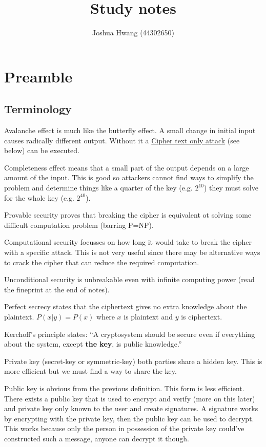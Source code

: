 \documentclass{report}
\title{Study notes}
\author{Joshua Hwang (44302650)}
\begin{document}
\maketitle

\chapter{Preamble}
\section{Terminology}
Avalanche effect is much like the butterfly effect. A small change in initial
input causes radically different output. Without it a
\underline{Cipher text only attack} (see below) can be executed.

Completeness effect means that a small part of the output depends on a large
amount of the input. This is good so attackers cannot find ways to simplify
the problem and determine things like a quarter of the key (e.g. $2^{10}$)
they must solve for the whole key (e.g. $2^{40}$).

Provable security proves that breaking the cipher is
equivalent ot solving some difficult computation problem (barring P=NP).

Computational security focusses on how long it would take to break the cipher
with a specific attack. This is not very useful since there may be alternative
ways to crack the cipher that can reduce the required computation.

Unconditional security is unbreakable even with infinite computing power
(read the fineprint at the end of notes).

Perfect secrecy states that the ciphertext gives no extra knowledge about
the plaintext. $P(x | y) = P(x)$ where $x$ is plaintext and $y$ is ciphertext.

Kerchoff's principle states: ``A cryptosystem should be secure even if
everything about the system, except \textbf{the key}, is public knowledge.''

Private key (secret-key or symmetric-key) both parties share a hidden key.
This is more efficient but we must find a way to share the key.

Public key is obvious from the previous definition. This form is less
efficient. There exists a public key that is used to encrypt and
verify (more on this later) and private key only known to the user and create
signatures. A signature works by encrypting with the private key, then
the public key can be used to decrypt. This works because only the person
in possession of the private key could've constructed such a message, anyone
can decrypt it though.
\end{document}
